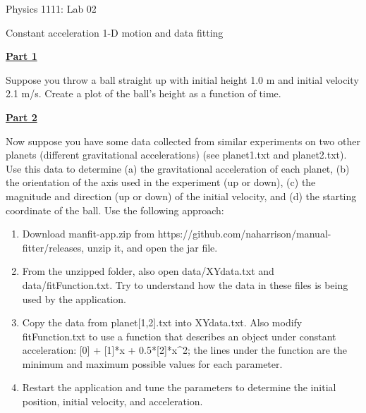 \documentclass[12pt]{article}
\begin{document}
{\centering
\large Physics 1111: Lab 02 \par
\large Constant acceleration 1-D motion and data fitting \par
}
\hfill \break \vspace{-4mm}

\underline{\textbf{Part 1}} \par
Suppose you throw a ball straight up with initial height 1.0 m and initial velocity 2.1 m/s.
Create a plot of the ball's height as a function of time.
\hfill \break

\underline{\textbf{Part 2}} \par
Now suppose you have some data collected from similar experiments on two other planets (different gravitational accelerations) (see planet1.txt and planet2.txt).
Use this data to determine
(a) the gravitational acceleration of each planet,
(b) the orientation of the axis used in the experiment (up or down),
(c) the magnitude and direction (up or down) of the initial velocity, and
(d) the starting coordinate of the ball.
Use the following approach:
\begin{enumerate}
\item Download manfit-app.zip from https://github.com/naharrison/manual-fitter/releases, unzip it, and open the jar file.
\item From the unzipped folder, also open data/XYdata.txt and data/fitFunction.txt. Try to understand how the data in these files is being used by the application.
\item Copy the data from planet[1,2].txt into XYdata.txt. Also modify fitFunction.txt to use a function that describes an object under constant acceleration: [0] + [1]*x + 0.5*[2]*x\string^2; the lines under the function are the minimum and maximum possible values for each parameter.
\item Restart the application and tune the parameters to determine the initial position, initial velocity, and acceleration.
\end{enumerate}
\end{document}
